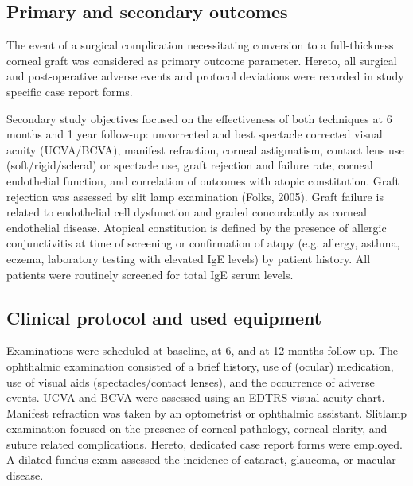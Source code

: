 \documentclass[authordate, empirical]{jote-new-article}
\begin{document}
	\subsection{Primary and secondary outcomes}



	The event of a surgical complication necessitating conversion to a full-thickness corneal graft was considered as primary outcome parameter. Hereto, all surgical and post-operative adverse events and protocol deviations were recorded in study specific case report forms.



	Secondary study objectives focused on the effectiveness of both techniques at 6 months and 1 year follow-up: uncorrected and best spectacle corrected visual acuity (UCVA/BCVA), manifest refraction, corneal astigmatism, contact lens use (soft/rigid/scleral) or spectacle use, graft rejection and failure rate, corneal endothelial function, and correlation of outcomes with atopic constitution. Graft rejection was assessed by slit lamp examination (Folks, 2005). Graft failure is related to endothelial cell dysfunction and graded concordantly as corneal endothelial disease. Atopical constitution is defined by the presence of allergic conjunctivitis at time of screening or confirmation of atopy (e.g. allergy, asthma, eczema, laboratory testing with elevated IgE levels) by patient history. All patients were routinely screened for total IgE serum levels.



	\subsection{Clinical protocol and used equipment}



	Examinations were scheduled at baseline, at 6, and at 12 months follow up. The ophthalmic examination consisted of a brief history, use of (ocular) medication, use of visual aids (spectacles/contact lenses), and the occurrence of adverse events. UCVA and BCVA were assessed using an EDTRS visual acuity chart. Manifest refraction was taken by an optometrist or ophthalmic assistant. Slitlamp examination focused on the presence of corneal pathology, corneal clarity, and suture related complications. Hereto, dedicated case report forms were employed. A dilated fundus exam assessed the incidence of cataract, glaucoma, or macular disease.
\end{document}
